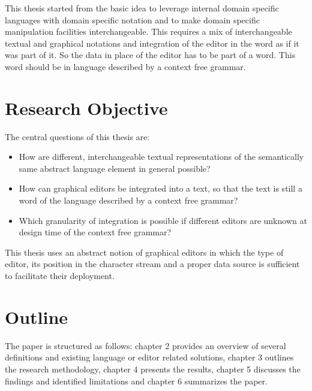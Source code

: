This thesis started from the basic idea to leverage internal domain specific languages with domain specific notation and to make domain specific manipulation facilities interchangeable. This requires a mix of interchangeable textual and graphical notations and integration of the editor in the word as if it was part of it. So the data in place of the editor has to be part of a word. This word should be in language described by a context free grammar.
 


\section{Research Objective}
The central questions of this thesis are:
\begin{itemize}
	\item How are different, interchangeable textual representations of the semantically same abstract language element in general possible?
	\item How can graphical editors be integrated into a text, so that the text is still a word of the language described by a context free grammar?
	\item Which granularity of integration is possible if different editors are unknown at design time of the context free grammar?
\end{itemize}

This thesis uses an abstract notion of graphical editors in which the type of editor, its position in the character stream and a proper data source is sufficient to facilitate their deployment.


\section{Outline}
The paper is structured as follows: chapter 2 provides an overview of several definitions and existing language or editor related solutions, chapter 3 outlines the research methodology, chapter 4 presents the results, chapter 5 discusses the findings and identified limitations and chapter 6 summarizes the paper.
